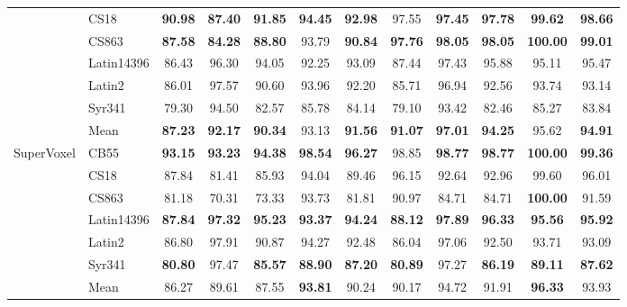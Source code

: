 \begin{table}[htbp]
\begin{tabular*}{\textwidth}{@{\extracolsep{\fill}}ll*{10}{c}@{}}
         & CS18 & \textbf{90.98} & \textbf{87.40} & \textbf{91.85} & \textbf{94.45} & \textbf{92.98} & 97.55 & \textbf{97.45} & \textbf{97.78} & \textbf{99.62} & \textbf{98.66} \\
         & CS863 & \textbf{87.58} & \textbf{84.28} & \textbf{88.80} & 93.79 & \textbf{90.84} & \textbf{97.76} & \textbf{98.05} & \textbf{98.05} & \textbf{100.00} & \textbf{99.01} \\
         & Latin14396 & 86.43 & 96.30 & 94.05 & 92.25 & 93.09 & 87.44 & 97.43 & 95.88 & 95.11 & 95.47 \\
         & Latin2 & 86.01 & 97.57 & 90.60 & 93.96 & 92.20 & 85.71 & 96.94 & 92.56 & 93.74 & 93.14 \\
         & Syr341 & 79.30 & 94.50 & 82.57 & 85.78 & 84.14 & 79.10 & 93.42 & 82.46 & 85.27 & 83.84 \\
        \addlinespace[1pt]
         & Mean & \textbf{87.23} & \textbf{92.17} & \textbf{90.34} & 93.13 & \textbf{91.56} & \textbf{91.07} & \textbf{97.01} & \textbf{94.25} & 95.62 & \textbf{94.91} \\
        \midrule
        SuperVoxel & CB55 & \textbf{93.15} & \textbf{93.23} & \textbf{94.38} & \textbf{98.54} & \textbf{96.27} & 98.85 & \textbf{98.77} & \textbf{98.77} & \textbf{100.00} & \textbf{99.36} \\
         & CS18 & 87.84 & 81.41 & 85.93 & 94.04 & 89.46 & 96.15 & 92.64 & 92.96 & 99.60 & 96.01 \\
         & CS863 & 81.18 & 70.31 & 73.33 & 93.73 & 81.81 & 90.97 & 84.71 & 84.71 & \textbf{100.00} & 91.59 \\
         & Latin14396 & \textbf{87.84} & \textbf{97.32} & \textbf{95.23} & \textbf{93.37} & \textbf{94.24} & \textbf{88.12} & \textbf{97.89} & \textbf{96.33} & \textbf{95.56} & \textbf{95.92} \\
         & Latin2 & 86.80 & 97.91 & 90.87 & 94.27 & 92.48 & 86.04 & 97.06 & 92.50 & 93.71 & 93.09 \\
         & Syr341 & \textbf{80.80} & 97.47 & \textbf{85.57} & \textbf{88.90} & \textbf{87.20} & \textbf{80.89} & 97.27 & \textbf{86.19} & \textbf{89.11} & \textbf{87.62} \\
        \addlinespace[1pt]
         & Mean & 86.27 & 89.61 & 87.55 & \textbf{93.81} & 90.24 & 90.17 & 94.72 & 91.91 & \textbf{96.33} & 93.93 \\
        \bottomrule
    \end{tabular*}
\end{table}

\FloatBarrier

